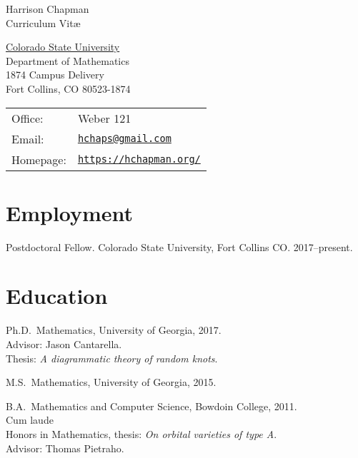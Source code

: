 \documentclass[letterpaper]{article}
\def\name{Harrison Chapman}
\renewenvironment{itemize}{
  \begin{list}{}{
    \setlength{\leftmargin}{1.5em}
  }
}{
  \end{list}
}
\begin{document}
{\huge \name}\\
{\large\sc Curriculum Vit\ae}


\vspace{0.25in}

\begin{minipage}{0.45\linewidth}
  \href{http://www.colostate.edu/}{Colorado State University} \\
  Department of Mathematics \\
  1874 Campus Delivery \\
  Fort Collins, CO 80523-1874
\end{minipage}
\begin{minipage}{0.45\linewidth}
  \begin{tabular}{ll}
    Office: & Weber 121 \\
    Email: & \href{mailto:hchaps@gmail.com}{\tt hchaps@gmail.com} \\
    Homepage: & \href{https://hchapman.org/}{\tt https://hchapman.org/} \\
  \end{tabular}
\end{minipage}

\section*{Employment}

\begin{itemize}
  \item Postdoctoral Fellow. Colorado State University, Fort Collins CO. 2017--present.
\end{itemize}

\section*{Education}

\begin{itemize}
\item Ph.D.\ Mathematics, University of Georgia, 2017.\\
  \textbullet \quad Advisor: Jason Cantarella.\\
  \textbullet \quad Thesis: \emph{A diagrammatic theory of random knots}.
\item M.S.\ Mathematics, University of Georgia, 2015.
\item B.A.\ Mathematics and Computer Science, Bowdoin College,
  2011.\\
  \textbullet \quad Cum laude \\
  \textbullet \quad Honors in Mathematics, thesis: \emph{On orbital varieties of type A}. \\
  \textbullet \quad Advisor: Thomas Pietraho.
\end{itemize}
\end{document}
